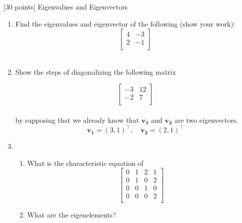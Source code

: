 [30 points] Eigenvalues and Eigenvectors\\

\vspace{0.1in}

\begin{enumerate}

    \item Find the eigenvalues and eigenvector of the following (show your work):
        \[\begin{bmatrix}
    4 & -3 \\
    2 & -1 \\
    \end{bmatrix}\]\\
    
    
    \item Show the steps of diagonalizing the following matrix %
    
    \[\begin{bmatrix}
    -3 & 12 \\
    -2 & 7 \\
    \end{bmatrix}\]\\
     by supposing that we already know that $\boldsymbol{v_1}$ and $\boldsymbol{v_2}$ are two eigenvectors.
    $$
    \boldsymbol{v_1} = (3,1)^\top, \quad \boldsymbol{v_2} = (2,1)^\top
    $$

    \item \begin{enumerate}
        \item What is the characteristic equation of \[ \begin{bmatrix} 
                    0 & 1 & 2 &  1\\
                    0 & 1 & 0 & 2\\
                    0 & 0 & 1 & 0\\
                    0 & 0 & 0 & 2\\ 
                \end{bmatrix}           
        \]
        \item What are the eigenelements? 
    \end{enumerate}
    
\end{enumerate}

